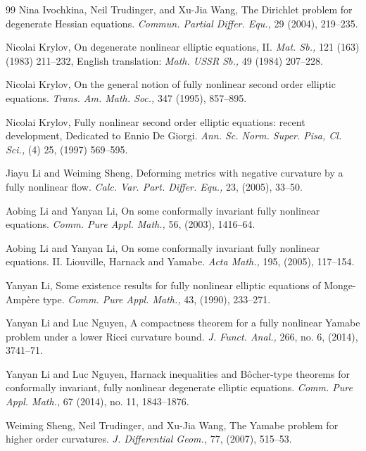 \documentclass{article}
\theoremstyle{plain}
\theoremstyle{definition}
\theoremstyle{definition}
\numberwithin{equation}{section}
\begin{document}
\begin{sloppypar}
\begin{thebibliography}{99}
 Nina Ivochkina, Neil Trudinger, and  Xu-Jia Wang, The Dirichlet problem for degenerate Hessian equations. {\em Commun. Partial Differ. Equ.,} 29 (2004), 219--235. 



 Nicolai Krylov,  On degenerate nonlinear elliptic equations, II. {\em Mat. Sb.,} 121 (163) (1983) 211--232, English translation: {\em Math. USSR Sb.,} 49 (1984) 207--228.

 Nicolai Krylov, On the general notion of fully nonlinear second order elliptic equations. {\em Trans. Am. Math. Soc.,} 347 (1995), 857--895.

 Nicolai Krylov, Fully nonlinear second order elliptic equations: recent development, Dedicated to Ennio De Giorgi. {\em Ann. Sc. Norm. Super. Pisa, Cl. Sci.,} (4) 25, (1997) 569--595. 


 Jiayu Li and Weiming Sheng,  Deforming metrics with negative curvature by a fully nonlinear flow. {\em Calc. Var. Part. Differ. Equ.,} 23, (2005), 33--50.

 Aobing Li and  Yanyan Li,  On some conformally invariant fully nonlinear equations. {\em Comm. Pure Appl. Math.,}
56, (2003), 1416--64.

 Aobing Li and Yanyan Li,  On some conformally invariant fully nonlinear equations. II. Liouville, Harnack and Yamabe. {\em Acta Math.,}  195, (2005), 117--154. 

 
 Yanyan Li, Some existence results for fully nonlinear elliptic equations of Monge-Amp\`ere type. 
{\em Comm. Pure Appl. Math.,} 43,  (1990), 233--271.

 Yanyan Li and  Luc Nguyen,  A compactness theorem for a fully nonlinear Yamabe problem under a lower Ricci curvature bound.  
{\em J. Funct. Anal.,}
266, no. 6, (2014), 3741--71.

 Yanyan Li and  Luc Nguyen, Harnack inequalities and B\^ocher-type theorems for conformally invariant, fully nonlinear degenerate elliptic equations. {\em Comm. Pure Appl. Math.,} 67 (2014), no. 11, 1843--1876.



 Weiming Sheng,  Neil Trudinger, and Xu-Jia Wang,  The Yamabe problem for higher order
curvatures. 
{\em J. Differential Geom.,}
77, (2007), 515--53.
 


\end{thebibliography}
\end{sloppypar}
\end{document}
